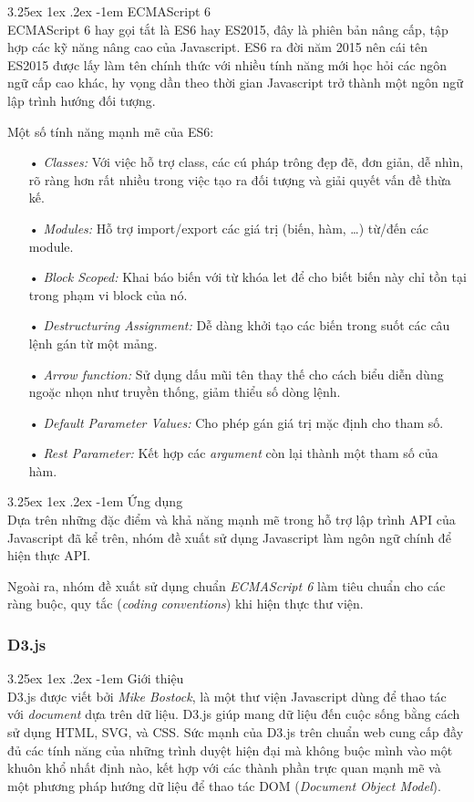 \documentclass[12pt,a4paper]{article}
\makeatletter
\newcommand{\myparagraph}[1]{\paragraph{#1}\mbox{}\\} %
\renewcommand\paragraph{\@startsection{paragraph}{5}{\z@}%
  {3.25ex \@plus1ex \@minus.2ex}%
  {-1em}%
  {\normalfont\normalsize\bfseries}}
\makeatother
\begin{document}
\myparagraph{ECMAScript 6}
ECMAScript 6 hay gọi tắt là ES6 hay ES2015, đây là phiên bản nâng cấp, tập hợp các kỹ năng nâng cao của Javascript. ES6 ra đời năm 2015 nên cái tên ES2015 được lấy làm tên chính thức với nhiều tính năng mới học hỏi các ngôn ngữ cấp cao khác, hy vọng dần theo thời gian Javascript trở thành một ngôn ngữ lập trình hướng đối tượng.

Một số tính năng mạnh mẽ của ES6:
\begin{itemize}
\item[•] \emph{Classes:} Với việc hỗ trợ class, các cú pháp trông đẹp đẽ, đơn giản, dễ nhìn, rõ ràng hơn rất nhiều  trong việc tạo ra đối tượng và giải quyết vấn đề thừa kế.
\item[•] \emph{Modules:} Hỗ trợ import/export các giá trị (biến, hàm, …) từ/đến các module.
\item[•] \emph{Block Scoped:} Khai báo biến với từ khóa \textsf{let} để cho biết biến này chỉ tồn tại trong phạm vi block của nó.
\item[•] \emph{Destructuring Assignment:} Dễ dàng khởi tạo các biến trong suốt các câu lệnh gán từ một mảng.
\item[•] \emph{Arrow function:} Sử dụng dấu mũi tên thay thế cho cách biểu diễn dùng ngoặc nhọn như truyền thống, giảm thiểu số dòng lệnh.
\item[•] \emph{Default Parameter Values:} Cho phép gán giá trị mặc định cho tham số.
\item[•] \emph{Rest Parameter:} Kết hợp các \textit{argument} còn lại thành một tham số của hàm.
\end{itemize}

\myparagraph{Ứng dụng}
Dựa trên những đặc điểm và khả năng mạnh mẽ trong hỗ trợ lập trình API của Javascript đã kể trên, nhóm đề xuất sử dụng Javascript làm ngôn ngữ chính để hiện thực API.

Ngoài ra, nhóm đề xuất sử dụng chuẩn \textit{ECMAScript 6} làm tiêu chuẩn cho các ràng buộc, quy tắc (\textit{coding conventions}) khi hiện thực thư viện.
\subsubsection{D3.js}
\myparagraph{Giới thiệu}
D3.js được viết bởi \textit{Mike Bostock}, là một thư viện Javascript dùng để thao tác với \textit{document} dựa trên dữ liệu. D3.js giúp mang dữ liệu đến cuộc sống bằng cách sử dụng HTML, SVG, và CSS. Sức mạnh của D3.js trên chuẩn web cung cấp đầy đủ các tính năng của những trình duyệt hiện đại mà không buộc mình vào một khuôn khổ nhất định nào, kết hợp với các thành phần trực quan mạnh mẽ và một phương pháp hướng dữ liệu để thao tác DOM (\textit{Document Object Model}).
\end{document}
